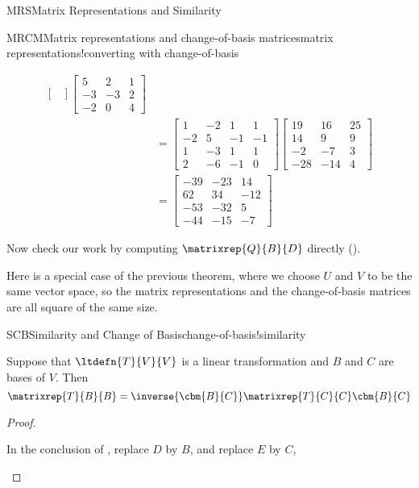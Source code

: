 \begin{subsect}{MRS}{Matrix Representations and Similarity}
\begin{example}{MRCM}{Matrix representations and change-of-basis matrices}{matrix representations!converting with change-of-basis}
\begin{para}
\begin{align*}
\begin{bmatrix}
\end{bmatrix}
%
\begin{bmatrix}
5 & 2 & 1\\
-3 & -3 & 2\\
-2 & 0 & 4
\end{bmatrix}\\
%
&=
\begin{bmatrix}
 1 & -2 & 1 & 1 \\
 -2 & 5 & -1 & -1 \\
 1 & -3 & 1 & 1 \\
 2 & -6 & -1 & 0
\end{bmatrix}
%
\begin{bmatrix}
 19 & 16 & 25 \\
 14 & 9 & 9 \\
 -2 & -7 & 3 \\
 -28 & -14 & 4
\end{bmatrix}\\
%
&=
\begin{bmatrix}
 -39 & -23 & 14 \\
 62 & 34 & -12 \\
 -53 & -32 & 5 \\
 -44 & -15 & -7
\end{bmatrix}
%
\end{align*}
\end{para}
%
\begin{para}Now check our work by computing $\matrixrep{Q}{B}{D}$ directly ().\end{para}
%
\end{example}
%
\begin{para}Here is a special case of the previous theorem, where we choose $U$ and $V$ to be the same vector space, so the matrix representations and the change-of-basis matrices are all square of the same size.\end{para}
%
\begin{theorem}{SCB}{Similarity and Change of Basis}{change-of-basis!similarity}
\begin{para}Suppose that $\ltdefn{T}{V}{V}$ is a linear transformation and $B$ and $C$ are bases of $V$.  Then
%
\begin{equation*}
\matrixrep{T}{B}{B}=\inverse{\cbm{B}{C}}\matrixrep{T}{C}{C}\cbm{B}{C}
\end{equation*}
\end{para}
%
\end{theorem}
%
\begin{proof}
\begin{para}In the conclusion of , replace $D$ by $B$, and replace $E$ by $C$,

\end{para}
\end{proof}
\end{subsect}
